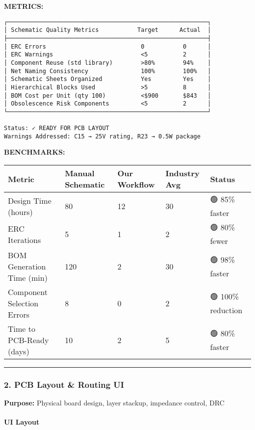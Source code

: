 \documentclass[
]{article}
\begin{document}
\textbf{METRICS:}

\begin{verbatim}
┌─────────────────────────────────────────────────────────┐
│ Schematic Quality Metrics           Target      Actual  │
├─────────────────────────────────────────────────────────┤
│ ERC Errors                           0           0      │
│ ERC Warnings                         <5          2      │
│ Component Reuse (std library)        >80%        94%    │
│ Net Naming Consistency               100%        100%   │
│ Schematic Sheets Organized           Yes         Yes    │
│ Hierarchical Blocks Used             >5          8      │
│ BOM Cost per Unit (qty 100)          <$900       $843   │
│ Obsolescence Risk Components         <5          2      │
└─────────────────────────────────────────────────────────┘

Status: ✓ READY FOR PCB LAYOUT
Warnings Addressed: C15 → 25V rating, R23 → 0.5W package
\end{verbatim}

\textbf{BENCHMARKS:}

\begin{longtable}[]{@{}lllll@{}}
\toprule\noalign{}
Metric & Manual Schematic & Our Workflow & Industry Avg & Status \\
\midrule\noalign{}
\endhead
\bottomrule\noalign{}
\endlastfoot
Design Time (hours) & 80 & 12 & 30 & 🟢 85\% faster \\
ERC Iterations & 5 & 1 & 2 & 🟢 80\% fewer \\
BOM Generation Time (min) & 120 & 2 & 30 & 🟢 98\% faster \\
Component Selection Errors & 8 & 0 & 2 & 🟢 100\% reduction \\
Time to PCB-Ready (days) & 10 & 2 & 5 & 🟢 80\% faster \\
\end{longtable}

\begin{center}\rule{0.5\linewidth}{0.5pt}\end{center}

\hypertarget{pcb-layout-routing-ui}{%
\subsubsection{2. PCB Layout \& Routing
UI}\label{pcb-layout-routing-ui}}

\textbf{Purpose:} Physical board design, layer stackup, impedance
control, DRC

\hypertarget{ui-layout-3}{%
\paragraph{UI Layout}\label{ui-layout-3}}
\end{document}
